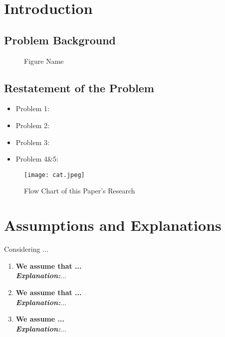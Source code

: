 \section{Introduction}
\subsection{Problem Background}

\begin{figure}[htbp]
    \centering    
	\caption{Figure Name} %
\end{figure}
\vspace{-1cm} %
\subsection{Restatement of the Problem}

\begin{itemize}
    \setlength{\parsep}{0ex} %
    \setlength{\topsep}{2ex} %
    \setlength{\itemsep}{1ex} %
    \item Problem 1: 
    \item Problem 2:
    \item Problem 3: 
    \item Problem 4\&5: 
\end{itemize}

\begin{figure}[H]  %
    \centering  %
    \texttt{[image: cat.jpeg]} %
    \caption{Flow Chart of this Paper's Research} %
\end{figure}
\vspace{-1cm}

\section{Assumptions and Explanations}
Considering ...
\begin{enumerate}
	\item \textbf{We assume that ...}\\
	\textbf{\textit{Explanation:}}...
	\item \textbf{We assume that ...}\\
	\textbf{\textit{Explanation:}}...
	\item \textbf{We assume ...}\\
	\textbf{\textit{Explanation:}}...
\end{enumerate}

